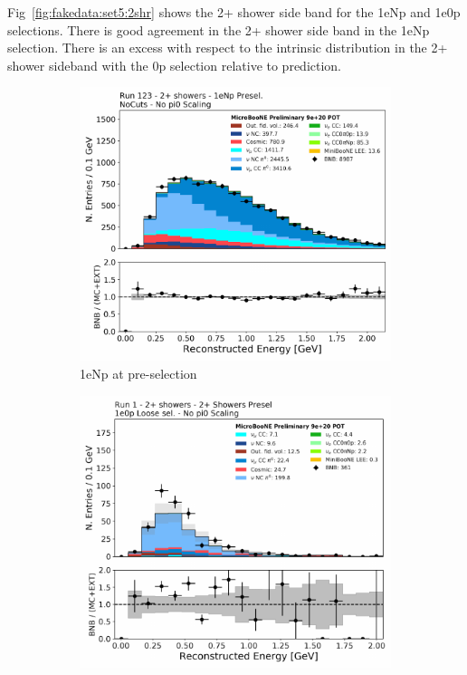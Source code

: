 Fig~\ref{fig:fakedata:set5:2shr} shows the 2+ shower side band for the 1eNp and 1e0p selections. There is good agreement in the 2+ shower side band in the 1eNp selection.  There is an excess with respect to the \nue intrinsic distribution in the 2+ shower sideband with the 0p selection relative to prediction.  

\begin{figure}[H] 
\begin{center}
    \begin{subfigure}[b]{0.45\textwidth}
    \centering
    \includegraphics[width=1.00\textwidth]{Fakedata/set5/np_2shr.pdf}
    \caption{\label{fig:fakedata:set5:2shrnp} 1eNp at pre-selection}
    \end{subfigure}
    \begin{subfigure}[b]{0.45\textwidth}
    \centering
    \includegraphics[width=1.00\textwidth]{Fakedata/set5/zp_2shr.pdf}

\end{subfigure}
\end{center}
\end{figure}
